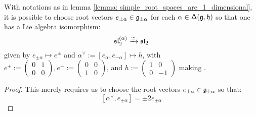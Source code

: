         \begin{corollary}[$\sl_2$-triples] \label{coro: sl_2_triples}
            With notations as in lemma \ref{lemma: simple_root_spaces_are_1_dimensional}, it is possible to choose root vectors $e_{\pm \alpha} \in \g_{\pm \alpha}$ for each $\alpha \in \simpleroots(\g, \h)$ so that one has a Lie algebra isomorphism:
                \begin{equation} \label{equation: sl_2_triples}
                    \sl_2^{(\alpha)} \xrightarrow[]{\cong} \sl_2
                \end{equation}
            given by $e_{\pm \alpha} \mapsto e^{\pm}$ and $\alpha^{\vee} := [e_{\alpha}, e_{-\alpha}] \mapsto h$, with $e^+ := \begin{pmatrix} 0 & 1 \\ 0 & 0 \end{pmatrix}, e^- := \begin{pmatrix} 0 & 0 \\ 1 & 0 \end{pmatrix}$, and $h := \begin{pmatrix} 1 & 0 \\ 0 & -1 \end{pmatrix}$ making .
        \end{corollary}
            \begin{proof}
                This merely requires us to choose the root vectors $e_{\pm \alpha} \in \g_{\pm \alpha}$ so that:
                    $$[\alpha^{\vee}, e_{\pm \alpha}] = \pm 2 e_{\pm \alpha}$$
            \end{proof}

        
